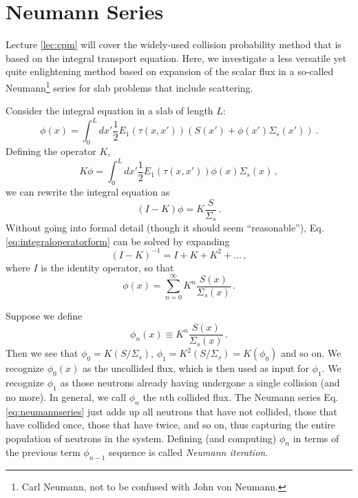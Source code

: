 \section*{Neumann Series}

Lecture \ref{lec:cpm} will cover the widely-used collision probability method that is based on the integral transport equation.  Here, we investigate a less versatile yet quite enlightening method based on expansion of the scalar flux in a so-called Neumann\footnote{Carl Neumann, not to be confused with John von Neumann.} series for slab problems that include scattering.

Consider the integral equation in a slab of length $L$:
\begin{equation}
 \phi(x) = \int^L_0  dx' \frac{1}{2} E_1(\tau(x,x'))(S(x') + \phi(x')\Sigma_s(x')) \, .
\end{equation}
Defining the operator $K$,
\begin{equation}
 K\phi = \int^L_0  dx' \frac{1}{2} E_1(\tau(x,x'))\phi(x) \Sigma_s(x) \, ,
\end{equation}
we can rewrite the integral equation as
\begin{equation}
 (I-K)\phi = K\frac{S}{\Sigma_s} \, .
 \label{eq:integraloperatorform}
\end{equation}
Without going into formal detail (though it should seem ``reasonable''), Eq. \ref{eq:integraloperatorform} can be solved by expanding
\begin{equation}
 (I-K)^{-1} = I + K + K^2 + \ldots \, ,
\end{equation}
where $I$ is the identity operator, so that 
\begin{equation}
 \phi(x) = \sum^{\infty}_{n=0} K^n \frac{S(x)}{\Sigma_s(x)} \, .
 \label{eq:neumannseries}
\end{equation}

Suppose we define
\begin{equation}
 \phi_n(x) \equiv K^n \frac{S(x)}{\Sigma_s(x)} \, .
\end{equation}
Then we see that $\phi_0 = K(S/\Sigma_s)$, $\phi_1 = K^2(S/\Sigma_s) = K(\phi_0)$ and so on.  We recognize $\phi_0(x)$ as the uncollided flux, which is then used as input for $\phi_1$.  We recognize $\phi_1$ as those neutrons already having undergone a single collision (and no more).  In general, we call $\phi_n$ the $n$th collided flux.  The Neumann series Eq. \ref{eq:neumannseries} just adds up all neutrons that have not collided, those that have collided once, those that have twice, and so on, thus capturing the entire population of neutrons in the system.  Defining (and computing)  $\phi_n$ in terms of the previous term $\phi_{n-1}$ sequence is called \textit{Neumann iteration}.


